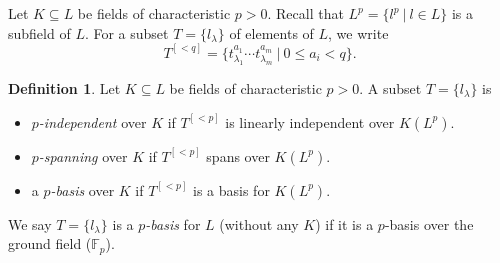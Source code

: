 \documentclass{amsart}[12pt]
\newcommand{\F}{\mathbb{F}}
\numberwithin{equation}{section}
\theoremstyle{plain} %
\theoremstyle{definition}
\newtheorem{defn}[equation]{Definition}
\theoremstyle{remark}
\begin{document}
 Let $K\subseteq L$ be fields of characteristic $p>0$. Recall that $L^p=\{ l^p \ | \ l\in L\}$ is a subfield of $L$. For a subset $T=\{l_\lambda\}$ of elements of $L$, we write 
\[T^{[<q]} = \{ t_{\lambda_1}^{a_1} \cdots t_{\lambda_m}^{a_m} \ | \ 0 \leq a_i <q\}.\]

\begin{defn} Let $K\subseteq L$ be fields of characteristic $p>0$. A subset $T=\{l_\lambda\}$ is
\begin{itemize}
\item \emph{$p$-independent} over $K$ if $T^{[<p]}$ is linearly independent over $K(L^p)$.
\item \emph{$p$-spanning} over $K$ if $T^{[<p]}$ spans over $K(L^p)$.
\item a \emph{$p$-basis}  over $K$ if $T^{[<p]}$ is a basis for $K(L^p)$.
\end{itemize}

We say $T=\{l_\lambda\}$ is a \emph{$p$-basis} for $L$ (without any $K$) if it is a $p$-basis over the ground field ($\F_p$).
\end{defn}
\end{document}
